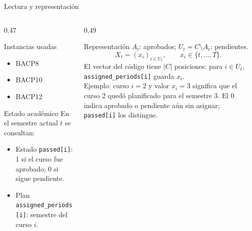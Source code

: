 \begin{frame}{Lectura y representación}
  \begin{columns}[T,onlytextwidth]
    \begin{column}{0.47\textwidth}
      \begin{block}{Instancias usadas}
        \begin{itemize}
          \item BACP8
          \item BACP10
          \item BACP12
        \end{itemize}
      \end{block}
      \begin{exampleblock}{Estado académico}
        \small
        En el semestre actual $t$ se consultan:
        \begin{itemize}
          \item Estado \texttt{passed[i]}: 1 si el curso fue aprobado; 0 si sigue pendiente.
          \item Plan \texttt{assigned\_periods[i]}: semestre del curso $i$.
        \end{itemize}
      \end{exampleblock}
    \end{column}
    \begin{column}{0.49\textwidth}
      \begin{block}{Representación}
        \small
        $A_t$: aprobados; $U_t=C\setminus A_t$: pendientes.\\[1mm]
        \[X_t=(x_i)_{i\in U_t},\qquad x_i\in\{t,\ldots,T\}.\]
        El vector del código tiene $|C|$ posiciones: para $i\in U_t$,
        \texttt{assigned\_periods[i]} guarda $x_i$.\\[2mm]
        Ejemplo: curso $i=2$ y valor $x_i=3$ significa que el curso 2
        quedó planificado para el semestre 3. El 0 indica aprobado o
        pendiente aún sin asignar; \texttt{passed[i]} los distingue.
      \end{block}
    \end{column}
  \end{columns}
\end{frame}
